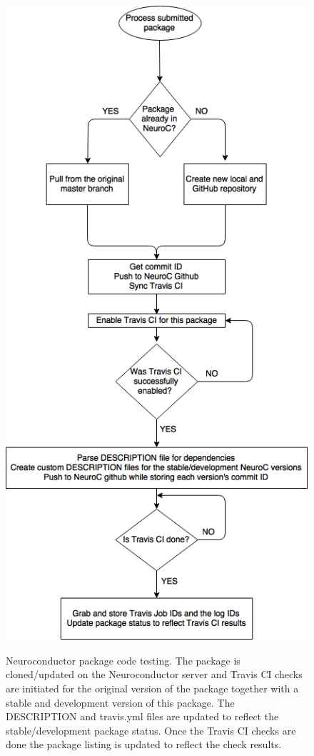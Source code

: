 \documentclass[]{elsarticle} %
\begin{document}
\begin{figure}[!ht]
  \begin{center}
    \caption{Neuroconductor package code testing. The package is cloned/updated on the Neuroconductor server and Travis CI checks are initiated for the original version of the package together with a stable and development version of this package. The DESCRIPTION and travis.yml files are updated to reflect the stable/development package status. Once the Travis CI checks are done the package listing is updated to reflect the check results.}
    \label{fig:stage2}
    \includegraphics[height=0.9\textheight]{flow_stage2_draft.png}\label{fig:package_lifetime_2}
  \end{center}
\end{figure}
\end{document}
